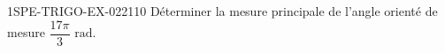 \begin{exercice}{1SPE-TRIGO-EX-022}{1}{10}
Déterminer la mesure principale de l'angle orienté de mesure $\dfrac{17\pi}{3}\text{ rad}$.
\end{exercice}

%

